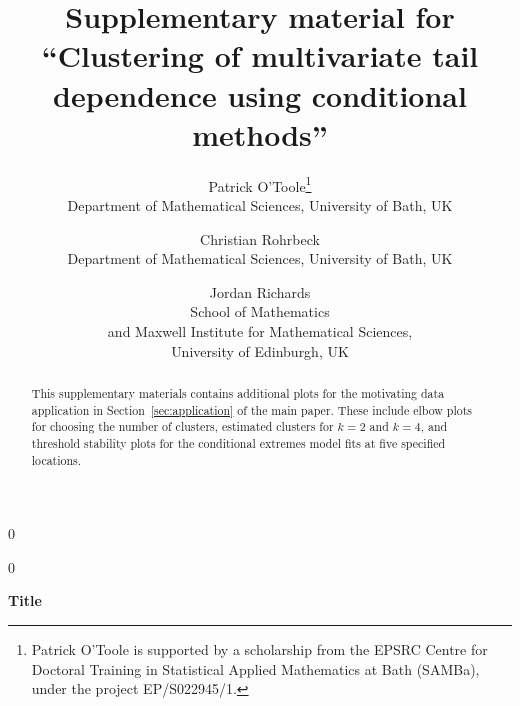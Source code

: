 \documentclass[12pt,compact]{article}
\newcommand{\blind}{0}
\begin{document}
\def\spacingset#1{\renewcommand{\baselinestretch}%
{#1}\small\normalsize} \spacingset{1}


\blind
{
  \title{\bf Supplementary material for ``Clustering of multivariate tail dependence using conditional methods''}
  \author{%
  Patrick O'Toole\thanks{Patrick O'Toole is supported by a scholarship from the EPSRC Centre for Doctoral Training in Statistical Applied Mathematics at Bath (SAMBa), under the project EP/S022945/1.}\\
  Department of Mathematical Sciences, University of Bath, UK
  \and
  Christian Rohrbeck\\
  Department of Mathematical Sciences, University of Bath, UK 
  \and
  Jordan Richards\\
  School of Mathematics \\
  and Maxwell Institute for Mathematical Sciences, \\
  University of Edinburgh, UK
  }
  \maketitle
} \fi

\blind
{
  \bigskip
  \begin{center}
    {\LARGE\bf Title}
\end{center}
  \medskip
} \fi

\begin{abstract}
  This supplementary materials contains additional plots for the motivating data application in Section~\ref{sec:application} of the main paper.
  These include elbow plots for choosing the number of clusters, estimated clusters for $k=2$ and $k=4$, and threshold stability plots for the conditional extremes model fits at five specified locations.
\end{abstract}
\end{document}

